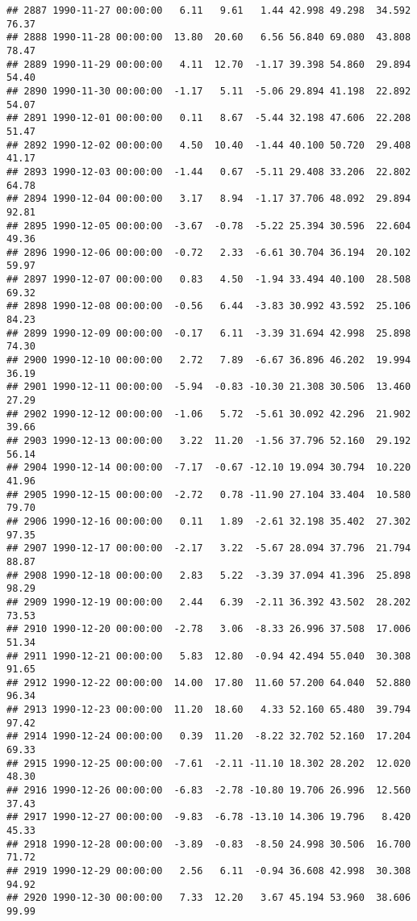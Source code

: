 \documentclass{article}\usepackage{graphicx, color}
\makeatletter
\newenvironment{kframe}{%
 \def\at@end@of@kframe{}%
 \ifinner\ifhmode%
  \def\at@end@of@kframe{\end{minipage}}%
  \begin{minipage}{\columnwidth}%
 \fi\fi%
 \def\FrameCommand##1{\hskip\@totalleftmargin \hskip-\fboxsep
 \colorbox{shadecolor}{##1}\hskip-\fboxsep
     \hskip-\linewidth \hskip-\@totalleftmargin \hskip\columnwidth}%
 \MakeFramed {\advance\hsize-\width
   \@totalleftmargin\z@ \linewidth\hsize
   \@setminipage}}%
 {\par\unskip\endMakeFramed%
 \at@end@of@kframe}
\newenvironment{knitrout}{}{} %
\makeatother
\begin{document}
\begin{knitrout}
\begin{kframe}
\begin{verbatim}
## 2887 1990-11-27 00:00:00   6.11   9.61   1.44 42.998 49.298  34.592  76.37
## 2888 1990-11-28 00:00:00  13.80  20.60   6.56 56.840 69.080  43.808  78.47
## 2889 1990-11-29 00:00:00   4.11  12.70  -1.17 39.398 54.860  29.894  54.40
## 2890 1990-11-30 00:00:00  -1.17   5.11  -5.06 29.894 41.198  22.892  54.07
## 2891 1990-12-01 00:00:00   0.11   8.67  -5.44 32.198 47.606  22.208  51.47
## 2892 1990-12-02 00:00:00   4.50  10.40  -1.44 40.100 50.720  29.408  41.17
## 2893 1990-12-03 00:00:00  -1.44   0.67  -5.11 29.408 33.206  22.802  64.78
## 2894 1990-12-04 00:00:00   3.17   8.94  -1.17 37.706 48.092  29.894  92.81
## 2895 1990-12-05 00:00:00  -3.67  -0.78  -5.22 25.394 30.596  22.604  49.36
## 2896 1990-12-06 00:00:00  -0.72   2.33  -6.61 30.704 36.194  20.102  59.97
## 2897 1990-12-07 00:00:00   0.83   4.50  -1.94 33.494 40.100  28.508  69.32
## 2898 1990-12-08 00:00:00  -0.56   6.44  -3.83 30.992 43.592  25.106  84.23
## 2899 1990-12-09 00:00:00  -0.17   6.11  -3.39 31.694 42.998  25.898  74.30
## 2900 1990-12-10 00:00:00   2.72   7.89  -6.67 36.896 46.202  19.994  36.19
## 2901 1990-12-11 00:00:00  -5.94  -0.83 -10.30 21.308 30.506  13.460  27.29
## 2902 1990-12-12 00:00:00  -1.06   5.72  -5.61 30.092 42.296  21.902  39.66
## 2903 1990-12-13 00:00:00   3.22  11.20  -1.56 37.796 52.160  29.192  56.14
## 2904 1990-12-14 00:00:00  -7.17  -0.67 -12.10 19.094 30.794  10.220  41.96
## 2905 1990-12-15 00:00:00  -2.72   0.78 -11.90 27.104 33.404  10.580  79.70
## 2906 1990-12-16 00:00:00   0.11   1.89  -2.61 32.198 35.402  27.302  97.35
## 2907 1990-12-17 00:00:00  -2.17   3.22  -5.67 28.094 37.796  21.794  88.87
## 2908 1990-12-18 00:00:00   2.83   5.22  -3.39 37.094 41.396  25.898  98.29
## 2909 1990-12-19 00:00:00   2.44   6.39  -2.11 36.392 43.502  28.202  73.53
## 2910 1990-12-20 00:00:00  -2.78   3.06  -8.33 26.996 37.508  17.006  51.34
## 2911 1990-12-21 00:00:00   5.83  12.80  -0.94 42.494 55.040  30.308  91.65
## 2912 1990-12-22 00:00:00  14.00  17.80  11.60 57.200 64.040  52.880  96.34
## 2913 1990-12-23 00:00:00  11.20  18.60   4.33 52.160 65.480  39.794  97.42
## 2914 1990-12-24 00:00:00   0.39  11.20  -8.22 32.702 52.160  17.204  69.33
## 2915 1990-12-25 00:00:00  -7.61  -2.11 -11.10 18.302 28.202  12.020  48.30
## 2916 1990-12-26 00:00:00  -6.83  -2.78 -10.80 19.706 26.996  12.560  37.43
## 2917 1990-12-27 00:00:00  -9.83  -6.78 -13.10 14.306 19.796   8.420  45.33
## 2918 1990-12-28 00:00:00  -3.89  -0.83  -8.50 24.998 30.506  16.700  71.72
## 2919 1990-12-29 00:00:00   2.56   6.11  -0.94 36.608 42.998  30.308  94.92
## 2920 1990-12-30 00:00:00   7.33  12.20   3.67 45.194 53.960  38.606  99.99

\end{verbatim}
\end{kframe}
\end{knitrout}
\end{document}
